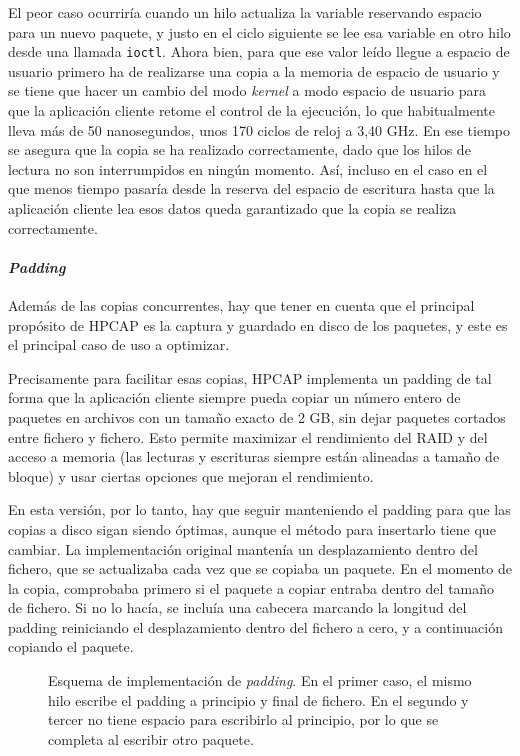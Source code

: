 \documentclass[oneside, draft]{epstfg}
\begin{document}
El peor caso ocurriría cuando un hilo actualiza la variable reservando espacio para un nuevo paquete, y justo en el ciclo siguiente se lee esa variable en otro hilo desde una llamada \texttt{ioctl}. Ahora bien, para que ese valor leído llegue a espacio de usuario primero ha de realizarse una copia a la memoria de espacio de usuario y se tiene que hacer un cambio del modo \textit{kernel} a modo espacio de usuario para que la aplicación cliente retome el control de la ejecución, lo que habitualmente lleva más de 50 nanosegundos, unos 170 ciclos de reloj a 3,40 GHz. En ese tiempo se asegura que la copia se ha realizado correctamente, dado que los hilos de lectura no son interrumpidos en ningún momento. Así, incluso en el caso en el que menos tiempo pasaría desde la reserva del espacio de escritura hasta que la aplicación cliente lea esos datos queda garantizado que la copia se realiza correctamente.

\paragraph{\textit{Padding}} Además de las copias concurrentes, hay que tener en cuenta que el principal propósito de HPCAP es la captura y guardado en disco de los paquetes, y este es el principal caso de uso a optimizar.

Precisamente para facilitar esas copias, HPCAP implementa un \gls{padding} \cite{MorenoTFM2012} de tal forma que la aplicación cliente siempre pueda copiar un número entero de paquetes en archivos con un tamaño exacto de 2 GB, sin dejar paquetes cortados entre fichero y fichero. Esto permite maximizar el rendimiento del \gls{RAID} y del acceso a memoria (las lecturas y escrituras siempre están alineadas a tamaño de bloque) y usar ciertas opciones que mejoran el rendimiento.

En esta versión, por lo tanto, hay que seguir manteniendo el \gls{padding} para que las copias a disco sigan siendo óptimas, aunque el método para insertarlo tiene que cambiar. La implementación original mantenía un desplazamiento dentro del fichero, que se actualizaba cada vez que se copiaba un paquete. En el momento de la copia, comprobaba primero si el paquete a copiar entraba dentro del tamaño de fichero. Si no lo hacía, se incluía una cabecera marcando la longitud del \gls{padding} reiniciando el desplazamiento dentro del fichero a cero, y a continuación copiando el paquete.

\begin{figure}[bp]
\centering

\caption[Esquema de implementación del \textit{padding} en el \textit{buffer} intermedio]{Esquema de implementación de \textit{padding}. En el primer caso, el mismo hilo escribe el \gls{padding} a principio y final de fichero. En el segundo y tercer no tiene espacio para escribirlo al principio, por lo que se completa al escribir otro paquete.}
\label{fig:BufferPadding}
\end{figure}
\end{document}
